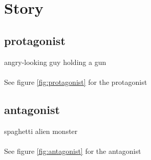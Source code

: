 \chapter{Story}
\section{protagonist}
angry-looking guy holding a gun\\
\\
See figure \ref{fig:protagonist} for the protagonist
\newpage
\section{antagonist}
spaghetti alien monster\\
\\
See figure \ref{fig:antagonist} for the antagonist